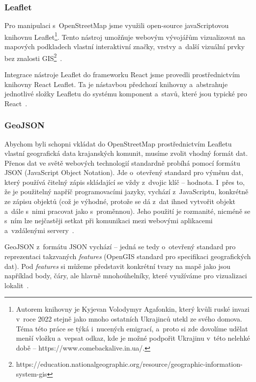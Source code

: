 \hypertarget{leaflet}{%
\subsubsection{Leaflet}\label{leaflet}}

Pro manipulaci s~OpenStreetMap jsme využili open-source javaScriptovou knihovnu Leaflet\footnote{Autorem knihovny je Kyjevan Volodymyr Agafonkin, který kvůli ruské invazi v~roce 2022 stejně jako mnoho ostatních Ukrajinců utekl ze svého domova. Téma této práce se týká i~nucených emigrací, a~proto si zde dovolíme udělat menší vložku a~vepsat odkaz, kde je možné podpořit Ukrajinu v~této nelehké době – https://www.comebackalive.in.ua/.}. Tento nástroj umožňuje webovým vývojářům vizualizovat na mapových podkladech vlastní interaktivní značky, vrstvy a~další vizuální prvky bez znalosti GIS\footnote{https://education.nationalgeographic.org/resource/geographic-information-system-gis}~\parencite{leaflet}.

Integrace nástroje Leaflet do frameworku React jsme provedli prostřednictvím knihovny React Leaflet. Ta je nástavbou předchozí knihovny a~abstrahuje jednotlivé složky Leafletu do systému komponent a~stavů, které jsou typické pro React~\parencite{react-leaflet}.

\hypertarget{geojson}{%
\subsubsection{GeoJSON}\label{geojson}}

Abychom byli schopni vkládat do OpenStreetMap prostřednictvím Leafletu vlastní geografická data krajanských komunit, musíme zvolit vhodný formát dat. Přenos dat ve světě webových technologií standardně probíhá pomocí formátu JSON (JavaScript Object Notation). Jde o~otevřený standard pro výměnu dat, který používá čitelný zápis skládající se vždy z~dvojic klíč -- hodnota. I~přes to, že je použitelný napříč programovacími jazyky, vychází z~JavaScriptu, konkrétně ze zápisu objektů (což je výhodné, protože se dá z~dat ihned vytvořit objekt a~dále s~nimi pracovat jako s~proměnnou). Jeho použití je rozmanité, nicméně se s~ním lze nejčastěji setkat při komunikaci mezi webovými aplikacemi a~vzdálenými servery~\parencite{json}.

GeoJSON z~formátu JSON vychází -- jedná se tedy o~otevřený standard pro reprezentaci takzvaných \emph{features} (OpenGIS standard pro specifikaci geografických dat). Pod \emph{features} si můžeme představit konkrétní tvary na mapě jako jsou například body, čáry, ale hlavně mnohoúhelníky, které využíváme pro vizualizaci lokalit~\parencite{geojson}.

